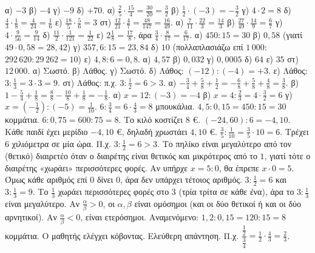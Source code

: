  α) $-3$ \quad β) $-4$ \quad γ) $-9$ \quad δ) $+70$.
 α) $\frac{2}{5}\cdot\frac{15}{4}=\frac{30}{20}=\frac{3}{2}$ \quad β) $\frac{1}{2}\cdot(-3)=-\frac{3}{2}$ \quad γ) $4\cdot2=8$ \quad δ) $\frac{4}{3}\cdot\frac{1}{8}=\frac{4}{24}=\frac{1}{6}$ \quad ε) $\frac{18}{5}\cdot\frac{5}{6}=3$ \quad στ) $\frac{12}{21}\cdot\frac{4}{7}=\frac{48}{147}=\frac{16}{49}$.
 α) $\frac{7}{11}\cdot\frac{22}{3}=\frac{14}{3}$ \quad β) $\frac{27}{49}\cdot\frac{14}{9}=\frac{6}{7}$ \quad γ) $4\cdot\frac{9}{56}=\frac{9}{14}$ \quad δ) $\frac{11}{2}\cdot\frac{1}{121}=\frac{1}{22}$ \quad ε) $2\frac{1}{8}=\frac{17}{8}$, άρα $\frac{3}{4}\cdot\frac{8}{17}=\frac{6}{17}$.
 α) $450:15=30$ \quad β) $0{,}58$ (γιατί $49\cdot0{,}58=28{,}42$) \quad γ) $357{,}6:15=23{,}84$ \quad δ) $10$ (πολλαπλασιάζω επί $1\,000$: $292\,620:29\,262=10$) \quad ε) $4{,}8:6=0{,}8$.
 α) $4{,}57$ \quad β) $0{,}032$ \quad γ) $0{,}0005$ \quad δ) $64$ \quad ε) $35$ \quad στ) $12\,000$.
 α) Σωστό. β) Λάθος. γ) Σωστό. δ) Λάθος: $(-12):(-4)=+3$. ε) Λάθος: $3:\frac{1}{3}=3\cdot3=9$. στ) Λάθος: π.χ. $3:\frac{1}{2}=6>3$.
 α) $-\frac{3}{4}+\frac{5}{8}+\frac{1}{2}=-\frac{6}{8}+\frac{5}{8}+\frac{4}{8}=\frac{3}{8}$. β) $1-\frac{5}{4}+\frac{1}{8}=\frac{8}{8}-\frac{10}{8}+\frac{1}{8}=-\frac{1}{8}$.
 α) $x=12:(-3)=-4$ \quad β) $x=4:\frac{2}{3}=4\cdot\frac{3}{2}=6$ \quad γ) $x=\left(-\frac{1}{2}\right):(-5)=\frac{1}{10}$.
 $6:\frac{3}{4}=6\cdot\frac{4}{3}=8$ μπουκάλια.
 $4{,}5:0{,}15=450:15=30$ κομμάτια.
 $6:0{,}75=600:75=8$. Το κιλό κοστίζει $8$ €.
 $(-24{,}60):6=-4{,}10$. Κάθε παιδί έχει μερίδιο $-4{,}10$ €, δηλαδή χρωστάει $4{,}10$ €.
 $\frac{3}{5}:\frac{1}{10}=\frac{3}{5}\cdot10=6$. Τρέχει $6$ χιλιόμετρα σε μία ώρα.
 Π.χ. $3:\frac{1}{2}=6>3$. Το πηλίκο είναι μεγαλύτερο από τον (θετικό) διαιρετέο όταν ο διαιρέτης είναι θετικός και μικρότερος από το $1$, γιατί τότε ο διαιρέτης «χωράει» περισσότερες φορές.
 Αν υπήρχε $x=5:0$, θα έπρεπε $x\cdot0=5$. Όμως κάθε αριθμός επί $0$ δίνει $0$, άρα δεν υπάρχει τέτοιος αριθμός.
 $3:\frac{1}{2}=6$ και $3:\frac{1}{3}=9$. Το $\frac{1}{3}$ χωράει περισσότερες φορές στο $3$ (τρία τρίτα σε κάθε ένα), άρα το $3:\frac{1}{3}$ είναι μεγαλύτερο.
 Αν $\frac{\alpha}{\beta}>0$, οι $\alpha,\beta$ είναι ομόσημοι (και οι δύο θετικοί ή και οι δύο αρνητικοί). Αν $\frac{\alpha}{\beta}<0$, είναι ετερόσημοι.
 Αναμενόμενο: $1{,}2:0{,}15=120:15=8$ κομμάτια. Ο μαθητής ελέγχει κόβοντας.
 Ελεύθερη απάντηση. Π.χ. $\dfrac{\frac{1}{2}}{\frac{3}{4}}=\frac{1}{2}\cdot\frac{4}{3}=\frac{2}{3}$.
